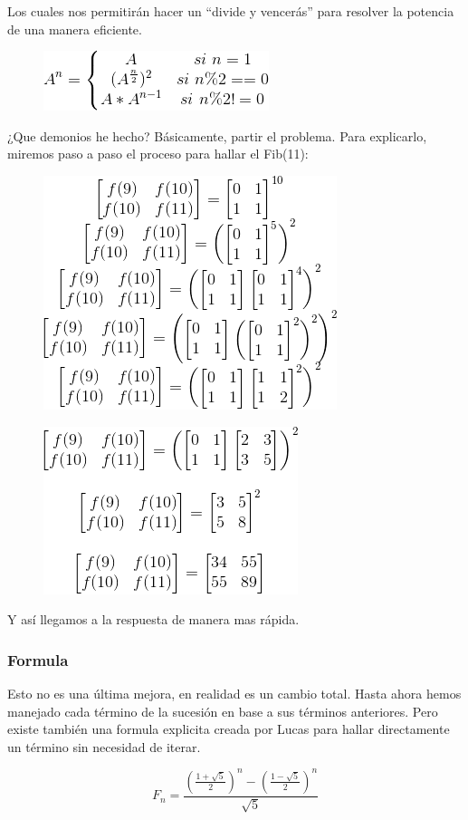 Los cuales nos permitirán hacer un “divide y vencerás” para resolver la potencia de una manera eficiente.

\begin{figure}[h]
	\centering
	\includegraphics[width=0.3\linewidth]{img/potencias}
	\label{fig:potencias}
\end{figure}

¿Que demonios he hecho? Básicamente, partir el problema. Para explicarlo, miremos paso a paso el proceso para hallar el Fib(11):


\begin{figure}[h]
	\centering
	\includegraphics[width=0.3\linewidth]{img/sola}
	\label{fig:solucion3}
\end{figure}

\begin{figure}[h]
	\centering
	\includegraphics[width=0.3\linewidth]{img/solucion2}
	\label{fig:solucion4}
\end{figure}

Y así llegamos a la respuesta de manera mas rápida.

\subsubsection*{Formula}

Esto no es una última mejora, en realidad es un cambio total. Hasta ahora hemos manejado cada término de la sucesión en base a sus términos anteriores. Pero existe también una formula explicita creada por Lucas para hallar directamente un término sin necesidad de iterar.

$$F_n = \frac{\left(\frac{1 + \sqrt{5}}{2}\right)^n - \left(\frac{1 - \sqrt{5}}{2}\right)^n}{\sqrt{5}}$$

